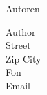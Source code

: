 \begin{Huge}
\noindent
Autoren
\end{Huge}

\begin{tabbing}
Author \\
Street \\
Zip City \\
Fon \\
Email \\
\end{tabbing}